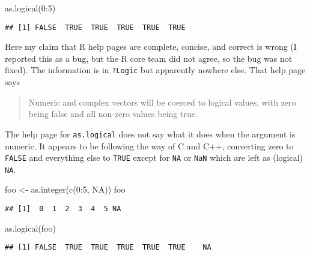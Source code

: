\documentclass[
]{article}
\newenvironment{Shaded}{\begin{snugshade}}{\end{snugshade}}
\newcommand{\ConstantTok}[1]{\textcolor[rgb]{0.00,0.00,0.00}{#1}}
\newcommand{\DecValTok}[1]{\textcolor[rgb]{0.00,0.00,0.81}{#1}}
\newcommand{\FunctionTok}[1]{\textcolor[rgb]{0.00,0.00,0.00}{#1}}
\newcommand{\NormalTok}[1]{#1}
\newcommand{\OtherTok}[1]{\textcolor[rgb]{0.56,0.35,0.01}{#1}}
\newcommand{\SpecialCharTok}[1]{\textcolor[rgb]{0.00,0.00,0.00}{#1}}
\begin{document}
\begin{Shaded}
\begin{Highlighting}[]
\FunctionTok{as.logical}\NormalTok{(}\DecValTok{0}\SpecialCharTok{:}\DecValTok{5}\NormalTok{)}
\end{Highlighting}
\end{Shaded}

\begin{verbatim}
## [1] FALSE  TRUE  TRUE  TRUE  TRUE  TRUE
\end{verbatim}

Here my claim that R help pages are complete, concise, and correct is
wrong (I reported this as a bug, but the R core team did not agree, so
the bug was not fixed). The information is in \texttt{?Logic} but
apparently nowhere else. That help page says

\begin{quote}
Numeric and complex vectors will be coerced to logical values, with zero
being false and all non-zero values being true.
\end{quote}

The help page for \texttt{as.logical} does not say what it does when the
argument is numeric. It appears to be following the way of C and C++,
converting zero to \texttt{FALSE} and everything else to \texttt{TRUE}
except for \texttt{NA} or \texttt{NaN} which are left as (logical)
\texttt{NA}.

\begin{Shaded}
\begin{Highlighting}[]
\NormalTok{foo }\OtherTok{\textless{}{-}} \FunctionTok{as.integer}\NormalTok{(}\FunctionTok{c}\NormalTok{(}\DecValTok{0}\SpecialCharTok{:}\DecValTok{5}\NormalTok{, }\ConstantTok{NA}\NormalTok{))}
\NormalTok{foo}
\end{Highlighting}
\end{Shaded}

\begin{verbatim}
## [1]  0  1  2  3  4  5 NA
\end{verbatim}

\begin{Shaded}
\begin{Highlighting}[]
\FunctionTok{as.logical}\NormalTok{(foo)}
\end{Highlighting}
\end{Shaded}

\begin{verbatim}
## [1] FALSE  TRUE  TRUE  TRUE  TRUE  TRUE    NA
\end{verbatim}
\end{document}
